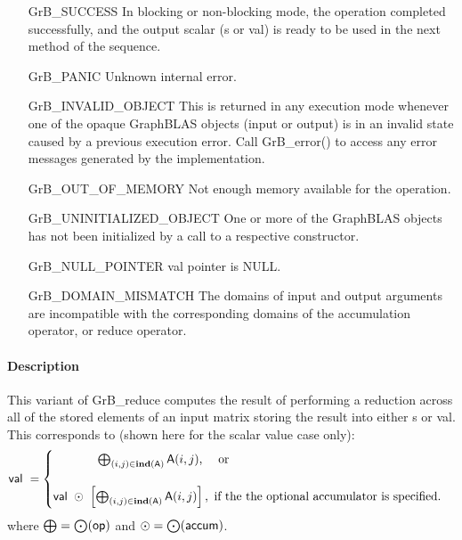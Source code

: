 \begin{itemize}[leftmargin=2.1in]
    \item[{\sf GrB\_SUCCESS}]         In blocking or non-blocking mode, 
    the operation completed successfully, and the
    output scalar ({\sf s} or {\sf val}) is ready to be used in the next method of 
    the sequence.

    \item[{\sf GrB\_PANIC}]           Unknown internal error.

    \item[{\sf GrB\_INVALID\_OBJECT}] This is returned in any execution mode 
    whenever one of the opaque GraphBLAS objects (input or output) is in an invalid 
    state caused by a previous execution error.  Call {\sf GrB\_error()} to access 
    any error messages generated by the implementation.

    \item[{\sf GrB\_OUT\_OF\_MEMORY}] Not enough memory available for the operation.

    \item[{\sf GrB\_UNINITIALIZED\_OBJECT}] One or more of the GraphBLAS objects 
    has not been initialized by a call to a respective constructor.

    \item[{\sf GrB\_NULL\_POINTER}]  {\sf val} pointer is {\sf NULL}.

    \item[{\sf GrB\_DOMAIN\_MISMATCH}]    The domains of input and output arguments are
    incompatible with the corresponding domains of the accumulation operator, 
    or reduce operator.
\end{itemize}

\paragraph{Description}

This variant of {\sf GrB\_reduce} computes the result of performing
a reduction across all of the stored elements of an input matrix storing the result into either
{\sf s} or {\sf val}.  This corresponds to (shown here for the scalar value case only):
\begin{equation*}
{\sf val} ~ = 
  \begin{cases}
     \hspace{3.7em} \bigoplus_{(i, j) \in \mathbf{ind}({\sf A})} {\sf A}(i, j) \text{,~~~ or} \\& \\
    {\sf val} ~\odot~ \left[ \bigoplus_{(i, j) \in \mathbf{ind}({\sf A})} {\sf A}(i, j)\right], \text{~if the the optional accumulator is specified.} 
  \end{cases}
\end{equation*}
where $\bigoplus = \bigodot({\sf op})$ and $\odot = \bigodot({\sf accum})$.  

